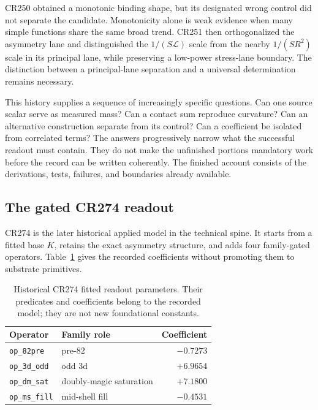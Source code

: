 CR250 obtained a monotonic binding shape, but its designated wrong control did not separate the candidate. Monotonicity alone is weak evidence when many simple functions share the same broad trend. CR251 then orthogonalized the asymmetry lane and distinguished the $1/(S\mathcal L)$ scale from the nearby $1/(SR^2)$ scale in its principal lane, while preserving a low-power stress-lane boundary. The distinction between a principal-lane separation and a universal determination remains necessary.

This history supplies a sequence of increasingly specific questions. Can one source scalar serve as measured mass? Can a contact sum reproduce curvature? Can an alternative construction separate from its control? Can a coefficient be isolated from correlated terms? The answers progressively narrow what the successful readout must contain. They do not make the unfinished portions mandatory work before the record can be written coherently. The finished account consists of the derivations, tests, failures, and boundaries already available.

\subsection{The gated CR274 readout}
\label{v2c5:cr274}

CR274 is the later historical applied model in the technical spine. It starts from a fitted base $K$, retains the exact asymmetry structure, and adds four family-gated operators. Table~\ref{v2c5:gates} gives the recorded coefficients without promoting them to substrate primitives.\cite{viispine}

\begin{table}[tb]
\centering
\small
\begin{tabular}{llr}
\hline
Operator & Family role & Coefficient\\
\hline
\texttt{op\_82pre} & pre-82 & $-0.7273$\\
\texttt{op\_3d\_odd} & odd 3d & $+6.9654$\\
\texttt{op\_dm\_sat} & doubly-magic saturation & $+7.1800$\\
\texttt{op\_ms\_fill} & mid-shell fill & $-0.4531$\\
\hline
\end{tabular}
\caption{Historical CR274 fitted readout parameters. Their predicates and coefficients belong to the recorded model; they are not new foundational constants.}
\label{v2c5:gates}
\end{table}

